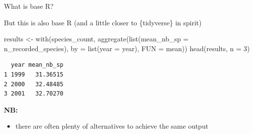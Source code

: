 \documentclass[
  ignorenonframetext,
  aspectratio=169,
]{beamer}
\newenvironment{Shaded}{\begin{snugshade}}{\end{snugshade}}
\newcommand{\AttributeTok}[1]{\textcolor[rgb]{0.40,0.45,0.13}{#1}}
\newcommand{\DecValTok}[1]{\textcolor[rgb]{0.68,0.00,0.00}{#1}}
\newcommand{\FunctionTok}[1]{\textcolor[rgb]{0.28,0.35,0.67}{#1}}
\newcommand{\NormalTok}[1]{\textcolor[rgb]{0.00,0.23,0.31}{#1}}
\newcommand{\OtherTok}[1]{\textcolor[rgb]{0.00,0.23,0.31}{#1}}
\providecommand{\tightlist}{%
  \setlength{\itemsep}{0pt}\setlength{\parskip}{0pt}}
\begin{document}
\begin{frame}[fragile]{What is base R?}
\protect{}\label{what-is-base-r-2}
\begin{block}{But this is also base R (and a little closer to
\{tidyverse\} in spirit)}
\protect{}\label{but-this-is-also-base-r-and-a-little-closer-to-tidyverse-in-spirit}
\footnotesize

\begin{Shaded}
\begin{Highlighting}[]
\NormalTok{results }\OtherTok{\textless{}{-}} \FunctionTok{with}\NormalTok{(species\_count, }
                \FunctionTok{aggregate}\NormalTok{(}\FunctionTok{list}\NormalTok{(}\AttributeTok{mean\_nb\_sp =}\NormalTok{ n\_recorded\_species),}
                          \AttributeTok{by =} \FunctionTok{list}\NormalTok{(}\AttributeTok{year =}\NormalTok{ year), }\AttributeTok{FUN =}\NormalTok{ mean))}
\FunctionTok{head}\NormalTok{(results, }\AttributeTok{n =} \DecValTok{3}\NormalTok{)}
\end{Highlighting}
\end{Shaded}

\begin{verbatim}
  year mean_nb_sp
1 1999   31.36515
2 2000   32.48485
3 2001   32.70270
\end{verbatim}

\normalsize

\vspace{1em}

\textbf{NB:}

\begin{itemize}
\tightlist
\item
  there are often plenty of alternatives to achieve the same output
\end{itemize}
\end{block}
\end{frame}
\end{document}
